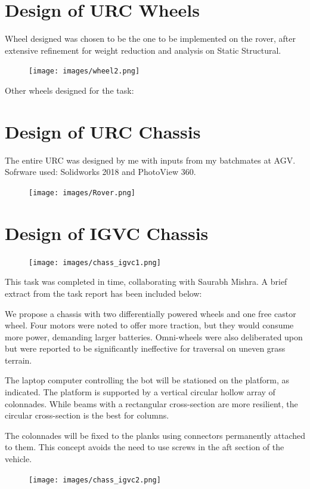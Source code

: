 \documentclass[a4paper,12pt]{report}
\begin{document}
\section{Design of URC Wheels}
Wheel designed was chosen to be the one to be implemented on the rover, after extensive refinement for weight reduction and analysis on Static Structural.

\begin{figure}[H]
	\centering
	\texttt{[image: images/wheel2.png]}
\end{figure}

Other wheels designed for the task:


\section{Design of URC Chassis}
The entire URC was designed by me with inputs from my batchmates at AGV. Sofrware used: Solidworks 2018 and PhotoView 360.

\begin{figure}[H]
	\centering
	\texttt{[image: images/Rover.png]}
\end{figure}

\section{Design of IGVC Chassis}
\begin{figure}[H]
	\centering
	\texttt{[image: images/chass\_igvc1.png]}
\end{figure}

This task was completed in time, collaborating with Saurabh Mishra. A brief extract from the task report has been included below:

\begin{displayquote}
We propose a chassis with two differentially powered wheels and one free castor wheel. Four motors were noted to offer more traction, but they would consume more power, demanding larger batteries. Omni-wheels were also deliberated upon but were reported to be significantly ineffective for traversal on uneven grass terrain.

The laptop computer controlling the bot will be stationed on the platform, as indicated. The platform is supported by a vertical circular hollow array of colonnades. While beams with a rectangular cross-section are more resilient, the circular cross-section is the best for columns. 

The colonnades will be fixed to the planks using connectors permanently attached to them. This concept avoids the need to use screws in the aft section of the vehicle.
\end{displayquote}

\begin{figure}[H]
	\centering
	\texttt{[image: images/chass\_igvc2.png]}
\end{figure}
\end{document}
